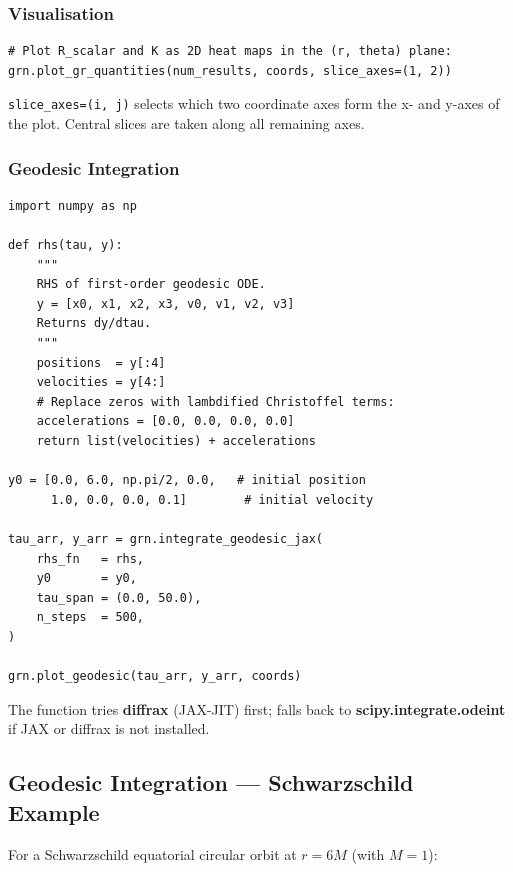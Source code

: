 \documentclass[11pt,a4paper]{article}
\newcommand{\code}[1]{\texttt{\small#1}}
\begin{document}
\subsubsection{Visualisation}

\begin{lstlisting}
# Plot R_scalar and K as 2D heat maps in the (r, theta) plane:
grn.plot_gr_quantities(num_results, coords, slice_axes=(1, 2))
\end{lstlisting}

\code{slice\_axes=(i, j)} selects which two coordinate axes form the x- and
y-axes of the plot.  Central slices are taken along all remaining axes.

\subsubsection{Geodesic Integration}

\begin{lstlisting}
import numpy as np

def rhs(tau, y):
    """
    RHS of first-order geodesic ODE.
    y = [x0, x1, x2, x3, v0, v1, v2, v3]
    Returns dy/dtau.
    """
    positions  = y[:4]
    velocities = y[4:]
    # Replace zeros with lambdified Christoffel terms:
    accelerations = [0.0, 0.0, 0.0, 0.0]
    return list(velocities) + accelerations

y0 = [0.0, 6.0, np.pi/2, 0.0,   # initial position
      1.0, 0.0, 0.0, 0.1]        # initial velocity

tau_arr, y_arr = grn.integrate_geodesic_jax(
    rhs_fn   = rhs,
    y0       = y0,
    tau_span = (0.0, 50.0),
    n_steps  = 500,
)

grn.plot_geodesic(tau_arr, y_arr, coords)
\end{lstlisting}

The function tries \textbf{diffrax} (JAX-JIT) first; falls back to
\textbf{scipy.integrate.odeint} if JAX or diffrax is not installed.

\subsection{Geodesic Integration — Schwarzschild Example}

For a Schwarzschild equatorial circular orbit at $r = 6M$ (with $M=1$):
\end{document}
